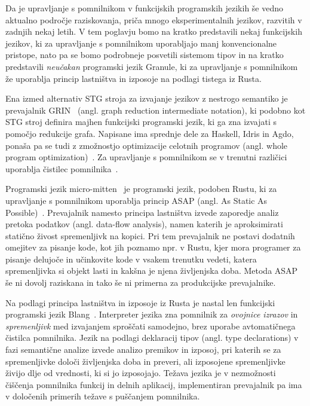 Da je upravljanje s pomnilnikom v funkcijskih programskih jezikih še vedno aktualno področje raziskovanja, priča mnogo eksperimentalnih jezikov, razvitih v zadnjih nekaj letih. V tem poglavju bomo na kratko predstavili nekaj funkcijskih jezikov, ki za upravljanje s pomnilnikom uporabljajo manj konvencionalne pristope, nato pa se bomo podrobneje posvetili sistemom tipov in na kratko predstavili \textit{neučakan} programski jezik Granule, ki za upravljanje s pomnilnikom že uporablja princip lastništva in izposoje na podlagi tistega iz Rusta.

Ena izmed alternativ STG stroja za izvajanje jezikov z nestrogo semantiko je  prevajalnik GRIN~\cite{boquist1997grin} (angl. graph reduction intermediate notation), ki podobno kot STG stroj definira majhen funkcijski programski jezik, ki ga zna izvajati s pomočjo redukcije grafa. Napisane ima sprednje dele za Haskell, Idris in Agdo, ponaša pa se tudi z zmožnostjo optimizacije celotnih programov (angl. whole program optimization)~\cite{podlovics2022modern}. Za upravljanje s pomnilnikom se v trenutni različici uporablja čistilec pomnilnika~\cite{boquist1999code}.

Programski jezik micro-mitten~\cite{corbyn:practical-static-memory-management} je programski jezik, podoben Rustu, ki za upravljanje s pomnilnikom uporablja princip ASAP (angl. As Static As Possible)~\cite{proust2017asap}. Prevajalnik namesto principa lastništva izvede zaporedje analiz pretoka podatkov (angl. data-flow analysis), namen katerih je aproksimirati statično živost spremenljivk na kopici. Pri tem prevajalnik ne postavi dodatnih omejitev za pisanje kode, kot jih poznamo npr. v Rustu, kjer mora programer za pisanje delujoče in učinkovite kode v vsakem trenutku vedeti, katera spremenljivka si objekt lasti in kakšna je njena življenjska doba. Metoda ASAP še ni dovolj raziskana in tako še ni primerna za produkcijske prevajalnike.

Na podlagi principa lastništva in izposoje iz Rusta je nastal len funkcijski programski jezik Blang~\cite{turk2022len}. Interpreter jezika zna pomnilnik za \emph{ovojnice izrazov} in \emph{spremenljivk} med izvajanjem sproščati samodejno, brez uporabe avtomatičnega čistilca pomnilnika. Jezik na podlagi deklaracij tipov (angl. type declarations) v fazi semantične analize izvede analizo premikov in izposoj, pri katerih se za spremenljivke določi življenjska doba in preveri, ali izposojene spremenljivke živijo dlje od vrednosti, ki si jo izposojajo. Težava jezika je v nezmožnosti čiščenja pomnilnika funkcij in delnih aplikacij, implementiran prevajalnik pa ima v določenih primerih težave s puščanjem pomnilnika.